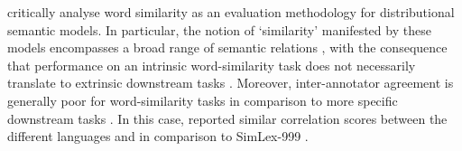 \textcite{Batchkarov2016} critically analyse word similarity as an evaluation
methodology for distributional semantic models.
In particular, the notion of `similarity' manifested by these models encompasses a
broad range of semantic relations \parencite[e.g.,][2]{Pado2003}, with the consequence
that performance on an intrinsic word-similarity task does not necessarily translate to
extrinsic downstream tasks \parencite[7-8]{Batchkarov2016}.
Moreover, inter-annotator agreement is generally poor for word-similarity tasks in
comparison to more specific downstream tasks \parencite[8-9]{Batchkarov2016}.
In this case, \textcites[8]{Armendariz2020}[42]{Armendariz2020a} reported similar
correlation scores between the different languages and in comparison to SimLex-999
\parencite[678-680]{Hill2015}.
